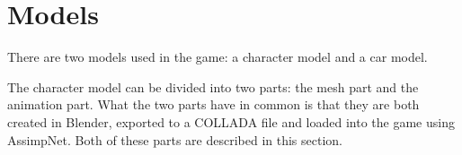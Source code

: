 \section{Models} \label{sec:theory_theory_models}
There are two models used in the game: a character model and a car model.

The character model can be divided into two parts: the mesh part and the animation part.
What the two parts have in common is that they are both created in Blender, exported to a COLLADA file and loaded into the game using AssimpNet.
Both of these parts are described in this section.



